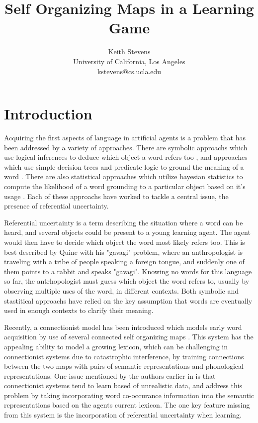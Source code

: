 \documentclass[11pt]{article}
\title{Self Organizing Maps in a Learning Game}
\author{Keith Stevens \\
  University of California, Los Angeles \\
  kstevens@cs.ucla.edu}
\date{}
\begin{document}
\maketitle

\section{Introduction}
Acquiring the first aspects of language in artificial agents is a problem that
has been addressed by a variety of approaches.  There are symbolic approachs
which use logical inferences to deduce which object a word refers too
\cite{Siskind}, and approaches which use simple decision trees and predicate
logic to ground the meaning of a word \cite{GoldNico}.  There are also
statistical approaches which utilize bayesian statistics to compute the
likelihood of a word grounding to a particular object based on it's usage
\cite{FazlyProbRefUn,SmithCommSystem,VogtSocial}.  Each of these approachs have worked to tackle a central issue, the
presence of referential uncertainty.  

Referential uncertainty is a term describing the situation where a word can be
heard, and several objects could be present to a young learning agent.  The
agent would then have to decide which object the word most likely refers too.
This is best described by Quine \cite{Quine} with his "gavagi" problem, where an
anthropologist is traveling with a tribe of people speaking a foreign tongue,
and suddenly one of them points to a rabbit and speaks "gavagi".  Knowing no
words for this language so far, the antrhopologist must guess which object the
word refers to, usually by observing multiple uses of the word, in different
contexts.  Both symbolic and stastitical approachs have relied on the key
assumption that words are eventually used in enough contexts to clarify their
meaning.

Recently, a connectionist model has been introduced which models early word
acquisition by use of several connected self organizing maps
\cite{LiDevLex,MiikDisLex}.
This system has the appealing ability to model a growing lexicon, which can be
challenging in connectionist systems due to catastrophic interference, by
training connections between the two maps with pairs of semantic representations
and phonological representations.  One issue mentioned by the authors earlier in
\cite{FarkasWcd} is that connectionist systems tend to learn based of unrealistic
data, and address this problem by taking incorporating word co-occurance
information into the semantic representations based on the agents current
lexicon.  The one key feature missing from this system is the incorporation of
referential uncertainty when learning.
\end{document}

